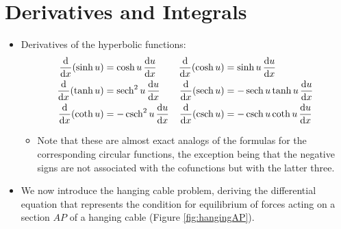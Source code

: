 \documentclass[../main.tex]{subfiles}
\begin{document}
\section{Derivatives and Integrals}\label{sss:8.3}
\begin{itemize}
    \item {}Derivatives of the hyperbolic functions:
    \begin{align*}
        \dv{x}(\sinh u) &= \cosh u\, \dv{u}{x}&
        \dv{x}(\cosh u) &= \sinh u\, \dv{u}{x}\\
        \dv{x}(\tanh u) &= \sech^2 u\, \dv{u}{x}&
        \dv{x}(\sech u) &= -\sech u\tanh u\, \dv{u}{x}\\
        \dv{x}(\coth u) &= -\csch^2 u\, \dv{u}{x}&
        \dv{x}(\csch u) &= -\csch u\coth u\, \dv{u}{x}
    \end{align*}
    \begin{itemize}
        \item Note that these are almost exact analogs of the formulas for the corresponding circular functions, the exception being that the negative signs are not associated with the cofunctions but with the latter three.
    \end{itemize}
    \item We now introduce the hanging cable problem, deriving the differential equation that represents the condition for equilibrium of forces acting on a section $AP$ of a hanging cable (Figure \ref{fig:hangingAP}).
    \begin{figure}[h!]
        \centering
\end{figure}
\end{itemize}
\end{document}
